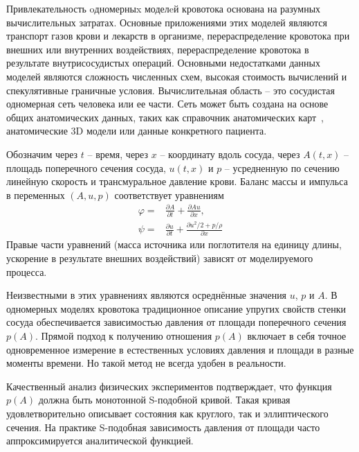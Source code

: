 Привлекательность oдномерныx моделeй кровотока основана на разумных вычислительных затратах. 
Основные приложениями этих моделей являются транспорт газов крови и лекарств в организме, перераспределение кровотока при внешних 
или внутренних воздействиях, перераспределение кровотока в результате внутрисосудистых операций. Основными недостатками данных моделей 
являются сложность численных схем, высокая стоимость вычислений и спекулятивные граничные условия. 
Вычислительная область -- это сосудистая одномерная сеть человека или ее части. 
Сеть может быть создана на основе общих анатомических данных, таких как справочник анатомических карт~\cite{bunicheva:2013}, 
анатомические 3D модели или данные конкретного пациента.

Обозначим через $t$ -- время, через $x$ -- координату вдоль сосуда, через $A(t, x)$ -- площадь поперечного сечения сосуда, 
$u(t, x)$ и $p$ -- усредненную по сечению линейную скорость и трансмуральное давление крови. Баланс массы и импульса в переменных 
$(A, u, p)$ соответствует уравнениям
\begin{align}
    \label{eq:mass-balance}
    \varphi=&\frac{\partial A}{\partial t}+\frac{\partial Au}{\partial x},\\
    \label{eq:momentum-balance}
    \psi=&\frac{\partial u}{\partial t}+ \frac{\partial u^2/2+p/\rho}{\partial x}
\end{align}
Правые части уравнений (масса источника или поглотителя на единицу длины, ускорение в результате внешних воздействий) зависят от моделируемого процесса. 

Неизвестными в этих уравнениях являются осреднённые значения $u$, $p$ и $A$.
В одномерных моделях кровотока традиционное описание упругих свойств стенки сосуда обеспечивается зависимостью давления от площади 
поперечного сечения $p(A)$. Прямой подход к получению отношения $p(A)$ включает в себя точное одновременное измерение в естественных 
условиях давления и площади в разные моменты времени. Но такой метод не всегда удобен в реальности.

Качественный анализ физических экспериментов подтверждает, что функция $p(A)$ должна быть монотонной S-подобной кривой. 
Такая кривая удовлетворительно описывает  состояния как круглого, так и эллиптического сечения. 
На практике S-подобная зависимость давления от площади часто аппроксимируется аналитической функцией. 

